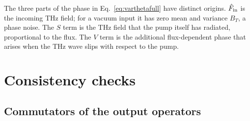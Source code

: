 \documentclass[aps,pra,onecolumn,notitlepage,11pt,amsmath,amssymb,nofootinbib]{revtex4-2}
\begin{document}
The three parts of the phase in Eq.~\eqref{eq:varthetafull} have distinct
origins. $\hat F_{\rm in}$ is the incoming THz field; for a vacuum input it has
zero mean and variance $B_T$, a phase noise. The $S$ term is the THz field
that the pump itself has radiated, proportional to the flux. The $V$ term is
the additional flux-dependent phase that arises when the THz wave slips with
respect to the pump.

\section{Consistency checks}
\label{sec:checks}

\subsection{Commutators of the output operators}
\end{document}
